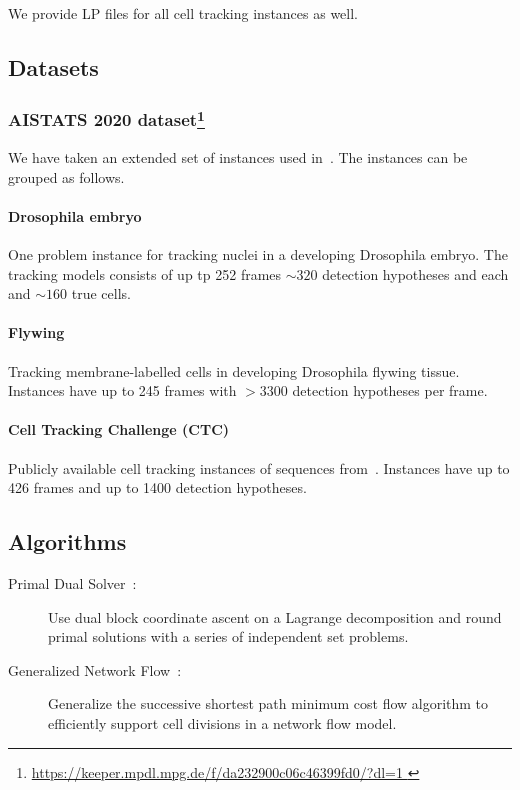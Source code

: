 We provide LP files for all cell tracking instances as well.

\subsection{Datasets}

\subsubsection[AISTATS 2020 dataset]{AISTATS 2020 dataset\footnote{\url{https://keeper.mpdl.mpg.de/f/da232900c06c46399fd0/?dl=1
}}}
We have taken an extended set of instances used in~\cite{haller2020primal}.
The instances can be grouped as follows.

\paragraph{Drosophila embryo}
One problem instance for tracking nuclei in a developing Drosophila embryo.
The tracking models consists of up tp 252 frames $\sim 320$ detection hypotheses and each and $\sim 160$ true cells.

\paragraph{Flywing}
Tracking membrane-labelled cells in developing Drosophila flywing tissue.
Instances have up to 245 frames with $> 3300$ detection hypotheses per frame.

\paragraph{Cell Tracking Challenge (CTC)}
Publicly available cell tracking instances of sequences from~\cite{ulman2017objective}.
Instances have up to 426 frames and up to 1400 detection hypotheses.

\subsection{Algorithms}
\begin{description}
\item[Primal Dual Solver~\cite{haller2020primal}:] Use dual block coordinate ascent on a Lagrange decomposition and round primal solutions with a series of independent set problems.
\item[Generalized Network Flow~\cite{haubold2016generalized}:] Generalize the successive shortest path minimum cost flow algorithm to efficiently support cell divisions in a network flow model.
\end{description}
